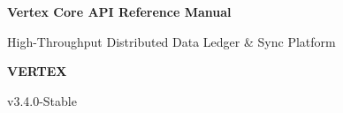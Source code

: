 \documentclass[10pt,letterpaper]{article}
\begin{document}
\begin{tcolorbox}[
  enhanced,
  colback=primary,
  colframe=primary,
  arc=0pt,
  outer arc=0pt,
  left=20pt,
  right=20pt,
  top=25pt,
  bottom=25pt,
  boxrule=0pt
]
  \begin{minipage}[c]{0.7\linewidth}
    \color{white}
    {\sffamily\LARGE\bfseries Vertex Core API Reference Manual \par}
    \vspace{0.5em}
    {\sffamily\large\color{borderlight} High-Throughput Distributed Data Ledger \& Sync Platform \par}
  \end{minipage}
  \hfill
  \begin{minipage}[c]{0.25\linewidth}
    \raggedleft\color{white}
    {\sffamily\bfseries\large VERTEX \par}
    \vspace{0.2em}
    {\sffamily\small v3.4.0-Stable \par}
  \end{minipage}
\end{tcolorbox}

\vspace{2em}






\newpage


\end{document}
